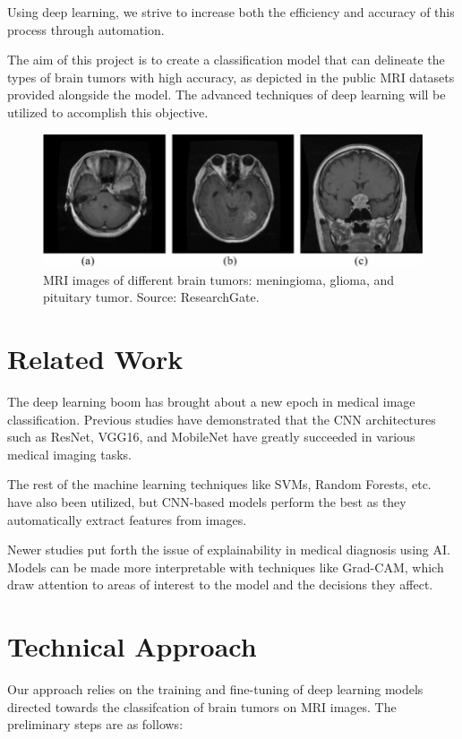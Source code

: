 \documentclass[10pt,twocolumn,letterpaper]{article}
\begin{document}
Using deep learning, we strive to increase both the efficiency and accuracy of this process through automation.

The aim of this project is to create a classification model that can delineate the types of brain tumors with high accuracy, as depicted in the public MRI datasets provided alongside the model. The advanced techniques of deep learning will be utilized to accomplish this objective.

\begin{figure}[H]
    \centering
    \includegraphics[width=0.9\linewidth]{MRI-images-of-three-different-brain-tumors-a-meningioma-b-glioma-and-c-pituitary.png}
    \caption{MRI images of different brain tumors: meningioma, glioma, and pituitary tumor. Source: ResearchGate.}
    \label{fig:brain_tumor_types}
\end{figure}


\section{Related Work}
The deep learning boom has brought about a new epoch in medical image classification. Previous studies have demonstrated that the CNN architectures such as ResNet, VGG16, and MobileNet have greatly succeeded in various medical imaging tasks.

The rest of the machine learning techniques like SVMs, Random Forests, etc. have also been utilized, but CNN-based models perform the best as they automatically extract features from images.

Newer studies put forth the issue of explainability in medical diagnosis using AI. Models can be made more interpretable with techniques like Grad-CAM, which draw attention to areas of interest to the model and the decisions they affect.

\section{Technical Approach}
Our approach relies on the training and fine-tuning of deep learning models directed towards the classifcation of brain tumors on MRI images.
The preliminary steps are as follows:
\end{document}
